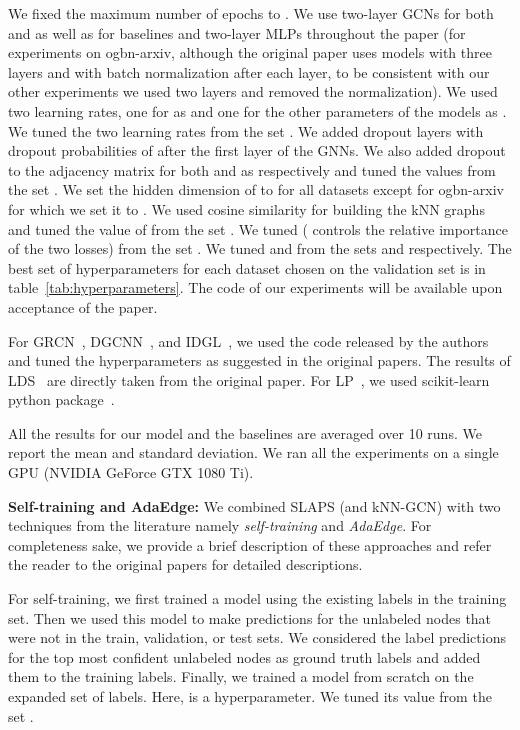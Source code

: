 \documentclass{article}
\begin{document}
We fixed the maximum number of epochs to .
We use two-layer GCNs for both  and  as well as for baselines and two-layer MLPs throughout the paper (for experiments on ogbn-arxiv, although the original paper uses models with three layers and with batch normalization after each layer, to be consistent with our other experiments we used two layers and removed the normalization). We used two learning rates, one for  as  and one for the other parameters of the models as . We tuned the two learning rates from the set . We added dropout layers with dropout probabilities of  after the first layer of the GNNs. We also added dropout to the adjacency matrix for both  and  as   respectively and tuned the values from the set . 
We set the hidden dimension of  to  for all datasets except for ogbn-arxiv for which we set it to .
We used cosine similarity for building the kNN graphs and tuned the value of  from the set .
We tuned  ( controls the relative importance of the two losses) from the set . We tuned  and  from the sets  and  respectively.
The best set of hyperparameters for each dataset chosen on the validation set is in table~\ref{tab:hyperparameters}.
The code of our experiments will be available upon acceptance of the paper.

For GRCN~\citep{GRCN}, DGCNN~\citep{DGCNN}, and IDGL~\citep{IDGL}, we used the code released by the authors and tuned the hyperparameters as suggested in the original papers. 
The results of LDS~\citep{franceschi2019learning} are directly taken from the original paper. 
For LP~\cite{zhu2003semi}, we used scikit-learn python package~\cite{pedregosa2011scikit}.

All the results for our model and the baselines are averaged over 10 runs. We report the mean and standard deviation.
We ran all the experiments on a single GPU (NVIDIA GeForce GTX 1080 Ti).

\textbf{Self-training and AdaEdge:} We combined SLAPS (and kNN-GCN) with two techniques from the literature namely \emph{self-training} and \emph{AdaEdge}. For completeness sake, we provide a brief description of these approaches and refer the reader to the original papers for detailed descriptions.

For self-training, we first trained a model using the existing labels in the training set. Then we used this model to make predictions for the unlabeled nodes that were not in the train, validation, or test sets. We considered the label predictions for the top  most confident unlabeled nodes as ground truth labels and added them to the training labels. Finally, we trained a model from scratch on the expanded set of labels. Here,  is a hyperparameter. We tuned its value from the set .
\end{document}
